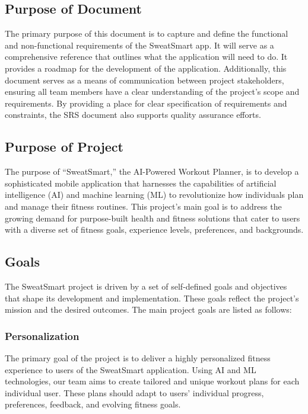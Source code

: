 \documentclass[12pt]{article}
\begin{document}
\subsection{Purpose of Document}
The primary purpose of this document is to capture and define the functional and non-functional requirements of the SweatSmart app. It will serve as a comprehensive reference that outlines what the application will need to do. It provides a roadmap for the development of the application. Additionally, this document serves as a means of communication between project stakeholders, ensuring all team members have a clear understanding of the project’s scope and requirements. By providing a place for clear specification of requirements and constraints, the SRS document also supports quality assurance efforts.

\subsection{Purpose of Project}
The purpose of “SweatSmart,” the AI-Powered Workout Planner, is to develop a sophisticated mobile application that harnesses the capabilities of artificial intelligence (AI) and machine learning (ML) to revolutionize how individuals plan and manage their fitness routines. This project’s main goal is to address the growing demand for purpose-built health and fitness solutions that cater to users with a diverse set of fitness goals, experience levels, preferences, and backgrounds.

\subsection{Goals}
The SweatSmart project is driven by a set of self-defined goals and objectives that shape its development and implementation. These goals reflect the project’s mission and the desired outcomes. The main project goals are listed as follows:

\subsubsection{Personalization}
The primary goal of the project is to deliver a highly personalized fitness experience to users of the SweatSmart application. Using AI and ML technologies, our team aims to create tailored and unique workout plans for each individual user. These plans should adapt to users’ individual progress, preferences, feedback, and evolving fitness goals.
\end{document}
